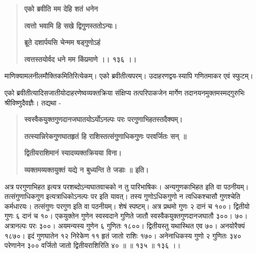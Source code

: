 \documentclass[11pt, openany]{book}
\begin{document}
\begin{sloppypar}
\begin{quote}
\hspace{1in}\textbf{एको ब्रवीति मम देहि शतं धनेन}

\hspace{1in}\textbf{त्वत्तो भवामि हि सखे द्विगुणस्ततोऽन्यः।}

\hspace{1in}\textbf{ब्रूते दशार्पयसि चेन्मम षड्गुणोऽहं}

\hspace{1in}\textbf{त्वत्तस्तयोर्वद धने मम किंप्रमाणे ।। १३६ ।।}
\end{quote}

\hangindent=0.2in \hspace{0.2in}माणिक्यामलनीलमौक्तिकमितिरित्येकम्। एको ब्रवीतीत्यपरम्। उदाहरणद्वय-स्यापि गणितमाकर एवं स्फुटम्।

\hangindent=0.2in \hspace{0.2in}एको ब्रवीतीत्यादिसजातीयोदाहरणेष्वव्यक्तक्रिया संक्षिप्य तत्परिपाकजेन मार्गेण तदानयनमुक्तमस्मद्गुरुभिः श्रीविष्णुदैवज्ञैः। तद्यथा -

\begin{quote}
\hspace{0.5in}\textbf{स्वस्वैकयुक्तगुणदानजघातयोऽर्योऽनल्पः परः परगुणाभिहतस्तदैक्यम्।}

\hspace{0.5in}\textbf{तत्स्यान्निरेकगुणघातहृतं हि राशिस्तत्संगुणाधिकगुणः परवर्जितः सन् ॥}

\hspace{1in}\textbf{द्वितीयराशिमानं स्यादव्यक्तक्रियया विना।}

\hspace{1in}\textbf{व्यक्तमव्यक्तयुक्तं यद्ये न बुध्यन्ति ते जडाः ॥ इति।}
\end{quote}

\hangindent=0.2in \hspace{0.2in}अत्र परगुणाभिहत इत्यत्र परशब्दोऽन्यघातवाचको न तु पारिभाषिकः। अन्यगुणकाभिहत इति वा पठनीयम्। तत्संगुणाधिकगुण इत्यत्राधिकोऽनल्पः पर इति यावत्। तस्य गुणोऽधिकगुणो न त्वधिकश्चासौ गुणश्चेति कर्मधारयः। तत्संगुणः परगुण इति वा पठनीयम्। शेषं स्पष्टम्। अत्र प्रथमो गुणः २ दानं च १००। द्वितीयो गुणः ६ दानं च १०। एकयुक्तेन गुणेन स्वस्वदाने गुणिते जातौ स्वस्वैकयुक्तगुणदानजघातौ ३००। ७०। अत्रानल्पः परः ३००। अयमन्यस्य गुणेन ६ गुणितः १८००। द्वितीयस्तु यथास्थित एव ७०। अनयोरैक्यं १८७०। इदं गुणघातेन १२ निरेकेण ११ हृतं जातो राशिः १७०। अनेनाधिकस्य गुणो २ गुणितः ३४० परेणानेन ३०० वर्जितो जातो द्वितीयराशिरिति ४० ॥ ॥ १३५ ॥ १३६ ।।


\end{sloppypar}
\end{document}
